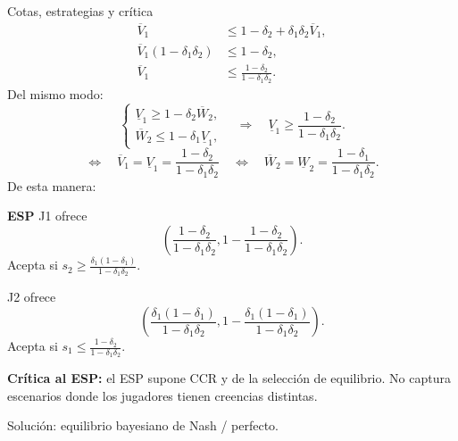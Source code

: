 \documentclass[11pt,a4paper]{article}
\makeatletter
\renewcommand\subsection{\@startsection{subsection}{2}{\z@}{-0.7em}{0.25em}
 {\normalfont\normalsize\bfseries\color{inkred}}}
\newenvironment{apuntebox}[1]{\begin{tcolorbox}[colback=palered,colframe=inkred,
 boxrule=0.7pt,arc=0mm,left=0.8em,right=0.8em,top=0.45em,bottom=0.45em]
 \textcolor{inkred}{\textbf{#1}}\quad}{\end{tcolorbox}}
\newcommand{\rojo}[1]{\textcolor{inkred}{#1}}
\makeatother
\begin{document}
\subsection{Cotas, estrategias y crítica}
\begin{align*}\overline V_1&\leq1-\delta_2+\delta_1\delta_2\overline V_1,\\\overline V_1(1-\delta_1\delta_2)&\leq1-\delta_2,\\\overline V_1&\leq\frac{1-\delta_2}{1-\delta_1\delta_2}.\end{align*}
Del mismo modo:
\[\begin{cases}\underline V_1\geq1-\delta_2\overline W_2,\\\overline W_2\leq1-\delta_1\underline V_1,\end{cases}\quad\Rightarrow\quad\underline V_1\geq\frac{1-\delta_2}{1-\delta_1\delta_2}.\]
\[\Longleftrightarrow\quad\overline V_1=\underline V_1=\frac{1-\delta_2}{1-\delta_1\delta_2}\quad\Longleftrightarrow\quad\overline W_2=\underline W_2=\frac{1-\delta_1}{1-\delta_1\delta_2}.\]
De esta manera:
\begin{apuntebox}{ESP}
J1 ofrece
\[\left(\frac{1-\delta_2}{1-\delta_1\delta_2},1-\frac{1-\delta_2}{1-\delta_1\delta_2}\right).\]
Acepta si $\displaystyle s_2\geq\frac{\delta_1(1-\delta_1)}{1-\delta_1\delta_2}$.

J2 ofrece
\[\left(\frac{\delta_1(1-\delta_1)}{1-\delta_1\delta_2},1-\frac{\delta_1(1-\delta_1)}{1-\delta_1\delta_2}\right).\]
Acepta si $\displaystyle s_1\leq\frac{1-\delta_2}{1-\delta_1\delta_2}$.
\end{apuntebox}
\rojo{\textbf{Crítica al ESP:}} el ESP supone CCR y de la selección de equilibrio. No captura escenarios donde los jugadores tienen creencias distintas.

\rojo{Solución:} equilibrio bayesiano de Nash / perfecto.
\end{document}
